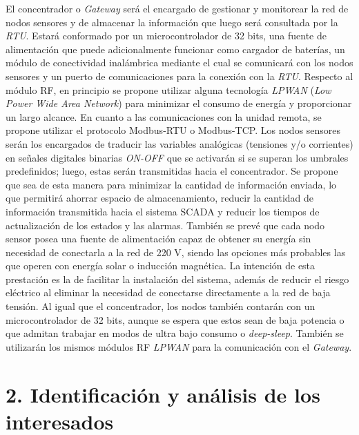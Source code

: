 \documentclass[
11pt, %
]{charter}
\begin{document}
El concentrador o \textit{Gateway} será el encargado de gestionar y monitorear la red de nodos sensores y de almacenar la información que luego será consultada por la \textit{RTU}. Estará conformado por un microcontrolador de 32 bits, una fuente de alimentación que puede adicionalmente funcionar como cargador de baterías, un módulo de conectividad inalámbrica mediante el cual se comunicará con los nodos sensores y un puerto de comunicaciones para la conexión con la \textit{RTU}. 
Respecto al módulo RF, en principio se propone utilizar alguna tecnología \textit{LPWAN }(\textit{Low Power Wide Area Network}) para minimizar el consumo de energía y proporcionar un largo alcance. En cuanto a las comunicaciones con la unidad remota, se propone utilizar el protocolo Modbus-RTU o Modbus-TCP.
Los nodos sensores serán los encargados de traducir las variables analógicas (tensiones y/o corrientes) en señales digitales binarias \textit{ON-OFF} que se activarán si se superan los umbrales predefinidos; luego, estas serán transmitidas hacia el concentrador. Se propone que sea de esta manera para minimizar la cantidad de información enviada, lo que permitirá ahorrar espacio de almacenamiento, reducir la cantidad de información transmitida hacia el sistema SCADA y reducir los tiempos de actualización de los estados y las alarmas. También se prevé que cada nodo sensor posea una fuente de alimentación capaz de obtener su energía sin necesidad de conectarla a la red de 220 V, siendo las opciones más probables las que operen con energía solar o inducción magnética. La intención de esta prestación es la de facilitar la instalación del sistema, además de reducir el riesgo eléctrico al eliminar la necesidad de conectarse directamente a la red de baja tensión.
Al igual que el concentrador, los nodos también contarán con un microcontrolador de 32 bits, aunque se espera que estos sean de baja potencia o que admitan trabajar en modos de ultra bajo consumo o \textit{deep-sleep}. También se utilizarán los mismos módulos RF \textit{LPWAN} para la comunicación con el \textit{Gateway}.


\section{2. Identificación y análisis de los interesados}
\label{sec:interesados}
\end{document}
